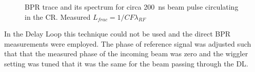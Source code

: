 \begin{figure}[!h]
\centering
{}
\caption[]{ BPR trace and its spectrum for circa 200~ns beam pulse circulating in the CR.
            Measured $L_{frac}=1/CF \lambda_{RF}$}
 
\end{figure}

In the Delay Loop this technique could not be used and the direct BPR measurements were employed.
The phase of reference signal was adjusted such that that the measured phase of the incoming beam
was zero and the wiggler setting was tuned that it was the same for the beam passing through the DL.

